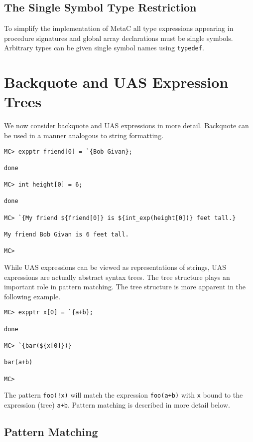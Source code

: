 \documentclass{article}
\begin{document}
\subsection{The Single Symbol Type Restriction}

To simplify the implementation of MetaC all type expressions appearing in procedure signatures and global array declarations must be single symbols.
Arbitrary types can be given single symbol names using {\tt typedef}.

\section{Backquote and UAS Expression Trees}

We now consider backquote and UAS expressions in more detail.  Backquote can be used in a manner analogous to string formatting.

\begin{verbatim}
MC> expptr friend[0] = `{Bob Givan};

done

MC> int height[0] = 6;

done

MC> `{My friend ${friend[0]} is ${int_exp(height[0])} feet tall.}

My friend Bob Givan is 6 feet tall.

MC> 
\end{verbatim}

While UAS expressions can be viewed as representations of strings, UAS
expressions are actually abstract syntax trees. The tree structure
plays an important role in pattern matching. The tree structure is
more apparent in the following example.

\begin{verbatim}
MC> expptr x[0] = `{a+b};

done

MC> `{bar(${x[0]})}

bar(a+b)

MC>
\end{verbatim}

The pattern {\tt foo(!x)} will match the expression {\tt foo(a+b)} with {\tt x} bound to the expression (tree) {\tt a+b}.
Pattern matching is described in more detail below.

\subsection{Pattern Matching}
\end{document}
